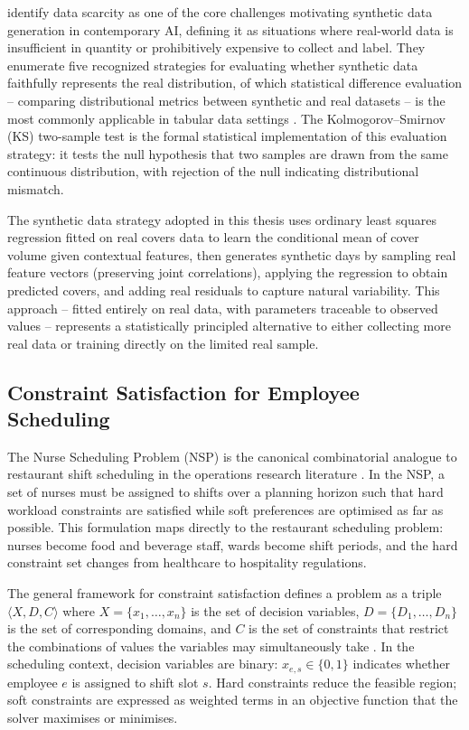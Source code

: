 \documentclass[12pt,a4paper,oneside]{article}
\begin{document}
\citet{lu2023} identify data scarcity as one of the core challenges motivating synthetic data generation in contemporary AI, defining it as situations where real-world data is insufficient in quantity or prohibitively expensive to collect and label. They enumerate five recognized strategies for evaluating whether synthetic data faithfully represents the real distribution, of which statistical difference evaluation -- comparing distributional metrics between synthetic and real datasets -- is the most commonly applicable in tabular data settings \citep{lu2023}. The Kolmogorov--Smirnov (KS) two-sample test is the formal statistical implementation of this evaluation strategy: it tests the null hypothesis that two samples are drawn from the same continuous distribution, with rejection of the null indicating distributional mismatch.

The synthetic data strategy adopted in this thesis uses ordinary least squares regression fitted on real covers data to learn the conditional mean of cover volume given contextual features, then generates synthetic days by sampling real feature vectors (preserving joint correlations), applying the regression to obtain predicted covers, and adding real residuals to capture natural variability. This approach -- fitted entirely on real data, with parameters traceable to observed values -- represents a statistically principled alternative to either collecting more real data or training directly on the limited real sample.

\subsection{Constraint Satisfaction for Employee Scheduling}

The Nurse Scheduling Problem (NSP) is the canonical combinatorial analogue to restaurant shift scheduling in the operations research literature \citep{bensaid2024}. In the NSP, a set of nurses must be assigned to shifts over a planning horizon such that hard workload constraints are satisfied while soft preferences are optimised as far as possible. This formulation maps directly to the restaurant scheduling problem: nurses become food and beverage staff, wards become shift periods, and the hard constraint set changes from healthcare to hospitality regulations.

The general framework for constraint satisfaction defines a problem as a triple $\langle X, D, C \rangle$ where $X = \{x_1, \ldots, x_n\}$ is the set of decision variables, $D = \{D_1, \ldots, D_n\}$ is the set of corresponding domains, and $C$ is the set of constraints that restrict the combinations of values the variables may simultaneously take \citep{rossi2006}. In the scheduling context, decision variables are binary: $x_{e,s} \in \{0, 1\}$ indicates whether employee $e$ is assigned to shift slot $s$. Hard constraints reduce the feasible region; soft constraints are expressed as weighted terms in an objective function that the solver maximises or minimises.
\end{document}
